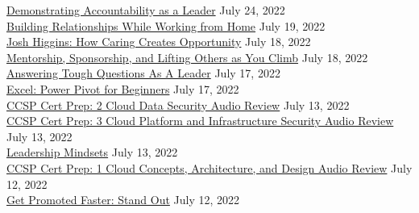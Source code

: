 \documentclass[10pt]{res} %
\begin{document}
\begin{resume}
\href{https://www.linkedin.com/learning/certificates/f43ce821c1d1d99f390996f3473c356876d178b96d4708bf72553326e72043a7}{\color{blue}Demonstrating Accountability as a Leader} \hfill July 24, 2022 \\
\href{https://www.linkedin.com/learning/certificates/417e50cf2a39db492d941e85437cf844c2ec0c2c3a4dca047ad9d8382d3b5979}{\color{blue}Building Relationships While Working from Home} \hfill July 19, 2022 \\
\href{https://www.linkedin.com/learning/certificates/862af70bf95692d344efbdde965a2f9f579dad1666a0d0c6b675ec5f232525a9}{\color{blue}Josh Higgins: How Caring Creates Opportunity} \hfill July 18, 2022 \\
\href{https://www.linkedin.com/learning/certificates/ab512d13d7c98411be84fb2909dac85c12af53ab95c1aa08caf357c771cb5f3a}{\color{blue}Mentorship, Sponsorship, and Lifting Others as You Climb} \hfill July 18, 2022 \\
\href{https://www.linkedin.com/learning/certificates/d735a17ed10cec1deff8f27df7ab6389c2e8d1cb5a44d0e4c02a8c821ce846f4}{\color{blue}Answering Tough Questions As A Leader} \hfill July 17, 2022 \\
\href{https://www.linkedin.com/learning/certificates/357858f313edf105e050997ad06339eb9b9b97d49d28b89571779a299a8e6bf5}{\color{blue}Excel: Power Pivot for Beginners} \hfill July 17, 2022 \\
\href{https://www.linkedin.com/learning/certificates/6e6a56f2901ce2bd754c14f77293ec7b135884094d0c0e38f653a45b160c9074}{\color{blue}CCSP Cert Prep: 2 Cloud Data Security Audio Review} \hfill July 13, 2022 \\
\href{https://www.linkedin.com/learning/certificates/72df2fe46567881f4604727b7527392fd032d5711bde776d85aaac4aeedc1bc8}{\color{blue}CCSP Cert Prep: 3 Cloud Platform and Infrastructure Security Audio Review} \hfill July 13, 2022 \\
\href{https://www.linkedin.com/learning/certificates/fca3810fb829c53277d868c842448dace5f1e39d3670eea94d39bdc840efd3c7}{\color{blue}Leadership Mindsets} \hfill July 13, 2022 \\
\href{https://www.linkedin.com/learning/certificates/236b0b9154fd4e7d7eda6de5baa011515442f375fc8256ef4f9ff2ee3304e545}{\color{blue}CCSP Cert Prep: 1 Cloud Concepts, Architecture, and Design Audio Review} \hfill July 12, 2022 \\
\href{https://www.linkedin.com/learning/certificates/3d7e67f494cb85ae21a4fb6e5f3bb735a312e1fc7f06ca8360cc8c55a7845bd1}{\color{blue}Get Promoted Faster: Stand Out} \hfill July 12, 2022 \\

\end{resume}
\end{document}
